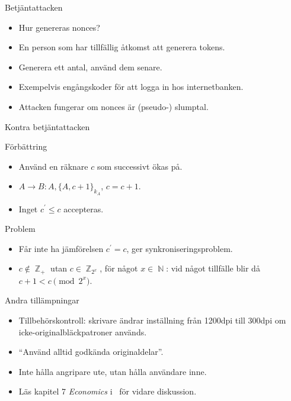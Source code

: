 \documentclass{beamer}
\DeclareMathOperator{\N}{\mathbb{N}}
\DeclareMathOperator{\Z}{\mathbb{Z}}
\newcommand{\encrypt}[2]{\{#1\}_{#2}}
\begin{document}
\begin{frame}{\insertsubsectionhead}{Betjäntattacken}
  \begin{itemize}
    \item Hur genereras nonces?
    \item En person som har tillfällig åtkomst att generera tokens.
    \item Generera ett antal, använd dem senare.
    \item Exempelvis engångskoder för att logga in hos internetbanken.
    \item Attacken fungerar om nonces är (pseudo-) slumptal.
  \end{itemize}
\end{frame}

\begin{frame}{\insertsubsectionhead}{Kontra betjäntattacken}
  \begin{block}{Förbättring}
    \begin{itemize}
      \item Använd en räknare \(c\) som successivt ökas på.
      \item \(A\to B\colon A, \encrypt{A, c+1}{k_A}\), \(c = c+1\).
      \item Inget \(c^\prime \leq c\) accepteras.
    \end{itemize}
  \end{block}
  \begin{block}{Problem}
    \begin{itemize}
      \item Får inte ha jämförelsen \(c^\prime = c\), ger 
        synkroniseringsproblem.
      \item \(c\notin \Z_+\) utan \(c\in \Z_{2^x}\), för något \(x\in \N\): vid 
        något tillfälle blir då \(c+1 < c \pmod{2^x}\).
    \end{itemize}
  \end{block}
\end{frame}

\begin{frame}{\insertsubsectionhead}{Andra tillämpningar}
  \begin{itemize}
    \item Tillbehörskontroll: skrivare ändrar inställning från \unit{1200}{dpi} 
      till \unit{300}{dpi} om icke-originalbläckpatroner används.
    \item \enquote{Använd alltid godkända originaldelar}.
    \item Inte hålla angripare ute, utan hålla användare inne.
    \item Läs kapitel 7 \emph{Economics} i~\cite{Anderson2008sea} för vidare 
      diskussion.
  \end{itemize}
\end{frame}
\end{document}
